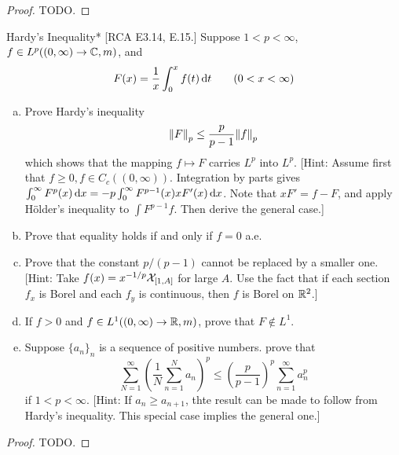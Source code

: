 \begin{proof}
    TODO. 
\end{proof}


\begin{problem}{Hardy's Inequality}*
    [RCA E3.14, E.15.] Suppose \(1 < p < \infty\), \(f \in L^p((0, \infty) \to \mathbb{C}, m)\), and 
    \[
        F(x) = \frac{1}{x} \int_0^x f(t) \, \mathrm{d}t
        \qquad
        (0 < x < \infty)
    \]
    \begin{enumerate}[(a)]
        \itemsep0em
        \item Prove Hardy's inequality 
        \[
            \norm{F}_p \leq \frac{p}{p-1} \norm{f}_p
        \]
        which shows that the mapping \(f \mapsto F\) carries \(L^p\) into \(L^p\). [Hint: Assume first that \(f \geq 0, f \in C_c((0,\infty))\). Integration by parts gives \(\int_0^\infty F^p(x) \, \mathrm{d}x = -p \int_0^\infty F^{p-1}(x) x F'(x) \, \mathrm{d}x\). Note that \(xF' = f - F\), and apply H\"older's inequality to \(\int F^{p-1} f\). Then derive the general case.]
        \item Prove that equality holds if and only if \(f = 0\) a.e. 
        \item Prove that the constant \(p/(p-1)\) cannot be replaced by a smaller one. [Hint: Take \(f(x) = x^{-1/p} \mathcal{X}_{[1, A]}\) for large \(A\). Use the fact that if each section \(f_x\) is Borel and each \(f_y\) is continuous, then \(f\) is Borel on \(\mathbb{R}^2\).]
        \item If \(f > 0\) and \(f \in L^1((0, \infty) \to \mathbb{R}, m)\), prove that \(F \not\in L^1\). 
        \item Suppose \(\{a_n\}_n\) is a sequence of positive numbers. prove that 
        \[
            \sum_{N=1}^\infty \left( \frac{1}{N} \sum_{n=1}^N a_n \right)^p
            \leq \left( \frac{p}{p-1} \right)^p \sum_{n=1}^\infty a_n^p
        \]
        if \(1 < p < \infty\). [Hint: If \(a_n \geq a_{n+1}\), thte result can be made to follow from Hardy's inequality. This special case implies the general one.]
    \end{enumerate}
\end{problem}


\begin{proof}
    TODO. 
\end{proof}


